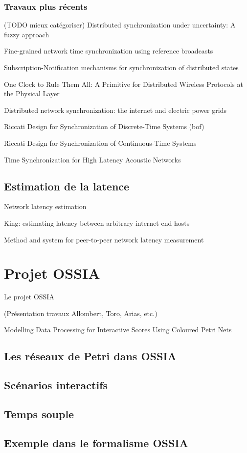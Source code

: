 \subsubsection{Travaux plus récents}
(TODO mieux catégoriser)
Distributed synchronization under uncertainty: A fuzzy approach

Fine-grained network time synchronization using reference broadcasts

Subscription-Notification mechanisms for synchronization of distributed states

One Clock to Rule Them All: A Primitive for Distributed Wireless Protocols at the Physical Layer

Distributed network synchronization: the internet and electric power grids

Riccati Design for Synchronization of Discrete-Time Systems (bof)

Riccati Design for Synchronization of Continuous-Time Systems

Time Synchronization for High Latency Acoustic Networks


\subsection{Estimation de la latence}
\label{section:latence}
Network latency estimation %

King: estimating latency between arbitrary internet end hosts

Method and system for peer-to-peer network latency measurement %


\section{Projet OSSIA}
Le projet \ac{OSSIA}

(Présentation travaux Allombert, Toro, Arias, etc.)

Modelling Data Processing for Interactive Scores Using Coloured Petri Nets


\subsection{Les réseaux de Petri dans OSSIA}
\subsection{Scénarios interactifs}
\subsection{Temps souple}
\subsection{Exemple dans le formalisme OSSIA}

